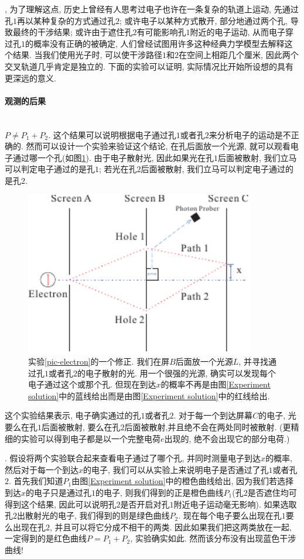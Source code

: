 \documentclass[a4paper,11pt]{article}
\theoremstyle{mystyle}
\begin{document}
, 为了理解这点, 历史上曾经有人思考过电子也许在一条复杂的轨道上运动, 先通过孔$1$再以某种复杂的方式通过孔$2$; 或许电子以某种方式散开, 部分地通过两个孔, 导致最终的干涉结果; 或许由于遮住孔$2$有可能影响孔$1$附近的电子运动, 从而电子穿过孔$1$的概率没有正确的被确定, 人们曾经试图用许多这种经典力学模型去解释这个结果. 当我们使用光子时, 可以使干涉路径$1$和$2$在空间上相距几个厘米, 因此两个交叉轨道几乎肯定是独立的. 下面的实验可以证明, 实际情况比开始所设想的具有更深远的意义.
\paragraph*{观测的后果}\quad\\
$P\neq P_1+P_2$. 这个结果可以说明根据电子通过孔$1$或者孔$2$来分析电子的运动是不正确的. 然而可以设计一个实验来验证这个结论, 在孔后面放一个光源, 就可以观看电子通过哪一个孔(如图\ref{Choose Experiment}). 由于电子散射光, 因此如果光在孔$1$后面被散射, 我们立马可以判定电子通过的是孔$1$; 若光在孔$2$后面被散射, 我们立马可以判定电子通过的是孔$2$.
\begin{figure}[H]
  \centering
  \includegraphics[width=10cm]{fig7.pdf}
  \caption{实验\ref{pic-electron}的一个修正. 我们在屏$B$后面放一个光源$L$, 并寻找通过孔$1$或者孔$2$的电子散射的光. 用一个很强的光源, 确实可以发现每个电子通过这个或那个孔. 但现在到达$x$的概率不再是由图\ref{Experiment solution}中的蓝线给出而是由图\ref{Experiment solution}中的红线给出.}\label{Choose Experiment}
\end{figure}
这个实验结果表示, 电子确实通过的孔$1$或者孔$2$. 对于每一个到达屏幕$C$的电子, 光要么在孔$1$后面被散射, 要么在孔$2$后面被散射,并且绝不会在两处同时被散射. (更精细的实验可以得到电子都是以一个完整电荷$e$出现的, 绝不会出现它的部分电荷.)

. 假设将两个实验联合起来查看电子通过了哪个孔, 并同时测量电子到达$x$的概率, 然后对于每一个到达$x$的电子, 我们可以从实验上来说明电子是否通过了孔$1$或者孔$2$. 首先我们知道$P_1$由图\ref{Experiment solution}中的橙色曲线给出, 因为我们若选择到达$x$的电子只是通过孔$1$的电子, 则我们得到的正是橙色曲线$P_1$(孔$2$是否遮住均可得到这个结果, 因此可以说明孔$2$是否开启对孔$1$附近电子运动毫无影响). 如果选取孔$2$出散射光的电子, 我们得到的则是绿色曲线$P_2$. 现在每个电子要么出现在孔$1$要么出现在孔$2$, 并且可以将它分成不相干的两类. 因此如果我们把这两类放在一起, 一定得到的是红色曲线$P=P_1+P_2$, 实验确实如此. 然而该分布没有出现蓝色干涉曲线!
\end{document}
